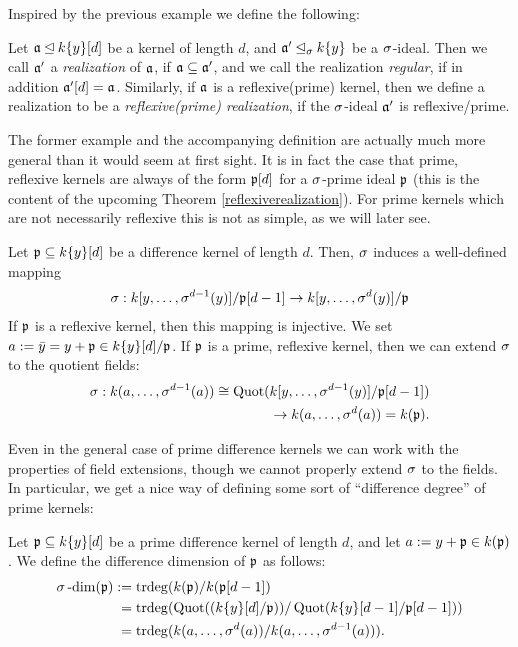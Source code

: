 Inspired by the previous example we define the following:
\begin{defn}
Let $\mathfrak{a} \unlhd k\{y\}[d]$ be a kernel of length $d$, and $\mathfrak{a}' \unlhd_{\sigma} k\{y\}$ be a $\sigma$-ideal. Then we call $\mathfrak{a}'$ a \emph{realization} of $\mathfrak{a}$, if $\mathfrak{a} \subseteq \mathfrak{a}'$, 
and we call the realization \emph{regular}, if in addition $\mathfrak{a}'[d] = \mathfrak{a}$. Similarly, if $\mathfrak{a}$ is a reflexive(prime) kernel, then we define a realization to be a \emph{reflexive(prime) realization}, if the $\sigma$-ideal $\mathfrak{a}'$ is reflexive/prime.
\end{defn}

The former example and the accompanying definition are actually much more general than it would seem at first sight. 
It is in fact the case that prime, reflexive kernels are always of the form $\mathfrak{p}[d]$ for a $\sigma$-prime ideal $\mathfrak{p}$ (this is the content of the upcoming Theorem \ref{reflexiverealization}).
For prime kernels which are not necessarily reflexive this is not as simple, as we will later see.

\begin{rem}\label{sigmawelldeffker}
Let $\mathfrak{p} \subseteq k\{y\}[d]$ be a difference kernel of length $d$. Then, $\sigma$ induces a well-defined mapping 
\begin{align*}
\sigma: k[y,\ldots,\sigma^{d-1}(y)]/\mathfrak{p}[d-1] \rightarrow k[y,\ldots,\sigma^{d}(y)]/\mathfrak{p}
\end{align*}
If $\mathfrak{p}$ is a reflexive kernel, then this mapping is injective. 
We set $a := \bar y = y + \mathfrak{p} \in k\{y\}[d]/\mathfrak{p}$. If $\mathfrak{p}$ is a prime, reflexive kernel, then we can extend $\sigma$ to the quotient fields:
\begin{align*} \sigma: k(a,\ldots,\sigma^{d-1}(a)) \cong \text{Quot}(k[y,\ldots,\sigma^{d-1}(y)]/\mathfrak{p}[d-1]) \\ \rightarrow k(a,\ldots,\sigma^d(a)) = k(\mathfrak{p}). \end{align*}
\end{rem}

Even in the general case of prime difference kernels we can work with the properties of field extensions, though we cannot properly extend $\sigma$ to the fields.
 In particular, we get a nice way of defining some sort of ``difference degree'' of prime kernels:
\begin{defn}
Let $\mathfrak{p} \subseteq k\{y\}[d]$ be a prime difference kernel of length $d$, and let $a:= y + \mathfrak{p} \in k(\mathfrak{p})$. We define the difference dimension of $\mathfrak{p}$ as follows:
\begin{align*}  \sigma\operatorname{-dim}(\mathfrak{p}) &:= \operatorname{trdeg}(k(\mathfrak{p})/k(\mathfrak{p}[d-1])  \\ &\phantom{:}= \operatorname{trdeg}(\operatorname{Quot}((k\{y\}[d]/\mathfrak{p}))/\operatorname{Quot}(k\{y\}[d-1]/\mathfrak{p}[d-1])) \\  &\phantom{:}= \operatorname{trdeg}(k(a,\ldots,\sigma^{d}(a))/k(a,\ldots,\sigma^{d-1}(a))). \end{align*}
\end{defn}

